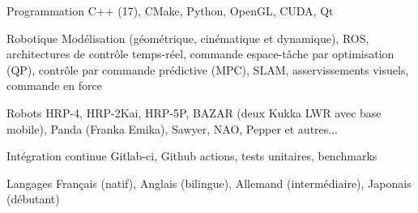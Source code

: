 

\begin{cvskills}

  \cvskill
    {Programmation} %
    {C++ (17), CMake, Python, OpenGL, CUDA, Qt} %

  \cvskill
    {Robotique} %
    {Modélisation (géométrique, cinématique et dynamique), ROS, architectures de contrôle temps-réel, commande espace-tâche par optimisation (QP), contrôle par commande prédictive (MPC), SLAM, asservissements visuels, commande en force} %

  \cvskill
    {Robots} %
    {HRP-4, HRP-2Kai, HRP-5P, BAZAR (deux Kukka LWR avec base mobile), Panda (Franka Emika), Sawyer, NAO, Pepper et autres...} %

  \cvskill
    {Intégration continue} %
    {Gitlab-ci, Github actions, tests unitaires, benchmarks} %

  \cvskill
    {Langages} %
    {Français (natif), Anglais (bilingue), Allemand (intermédiaire), Japonais (débutant)} %

\end{cvskills}
